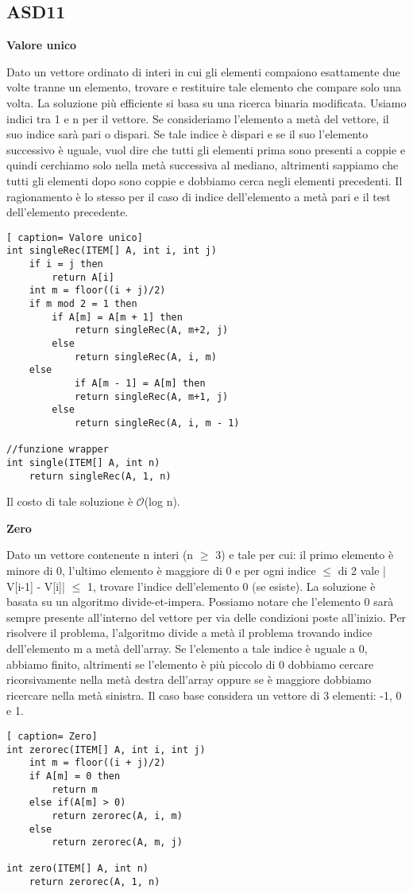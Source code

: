 \documentclass[../cheatSheetAlgoritmi.tex]{subfiles}
\begin{document}
\subsection{ASD11}
\textbf{Valore unico}

Dato un vettore ordinato di interi in cui gli elementi compaiono esattamente due volte tranne un elemento, trovare e restituire tale elemento che compare solo una volta. La soluzione più efficiente si basa su una ricerca binaria modificata. Usiamo indici tra 1 e n per il vettore. Se consideriamo l'elemento a metà del vettore, il suo indice sarà pari o dispari. Se tale indice è dispari e se il suo l'elemento successivo è uguale, vuol dire che tutti gli elementi prima sono presenti a coppie e quindi cerchiamo solo nella  metà successiva al mediano, altrimenti sappiamo che tutti gli elementi dopo sono coppie e dobbiamo cerca negli elementi precedenti. Il ragionamento è lo stesso per il caso di indice dell'elemento a metà pari e il test dell'elemento precedente.
\newpage
\begin{lstlisting}[ caption= Valore unico]
int singleRec(ITEM[] A, int i, int j)
	if i = j then
		return A[i]
	int m = floor((i + j)/2)
	if m mod 2 = 1 then
		if A[m] = A[m + 1] then
			return singleRec(A, m+2, j)
		else
			return singleRec(A, i, m)
	else
			if A[m - 1] = A[m] then
			return singleRec(A, m+1, j)
		else
			return singleRec(A, i, m - 1)
			
//funzione wrapper
int single(ITEM[] A, int n)
	return singleRec(A, 1, n)
\end{lstlisting}
Il costo di tale soluzione è $\mathcal{O}$(log n).

\bigskip

\textbf{Zero}

Dato un vettore contenente n interi (n $\geq$ 3) e tale per cui: il primo elemento è minore di 0, l'ultimo elemento è maggiore di 0 e per ogni indice $\leq$ di 2 vale | V[i-1] - V[i]| $\leq$ 1, trovare l'indice dell'elemento 0 (se esiste). La soluzione è basata su un algoritmo divide-et-impera. Possiamo notare che l'elemento 0 sarà sempre presente all'interno del vettore per via delle condizioni poste all'inizio. Per risolvere il problema, l'algoritmo divide a metà il problema trovando indice dell'elemento m a metà dell'array. Se l'elemento a tale indice è uguale a 0, abbiamo finito, altrimenti se l'elemento è più piccolo di 0 dobbiamo cercare ricorsivamente nella metà destra dell'array oppure se è maggiore dobbiamo ricercare nella metà sinistra. Il caso base considera un vettore di 3 elementi: -1, 0 e 1.
 
\begin{lstlisting}[ caption= Zero]
int zerorec(ITEM[] A, int i, int j)
	int m = floor((i + j)/2)
	if A[m] = 0 then
		return m
	else if(A[m] > 0)
		return zerorec(A, i, m)
	else
		return zerorec(A, m, j)
			
int zero(ITEM[] A, int n)
	return zerorec(A, 1, n)
\end{lstlisting}

\newpage
\end{document}
